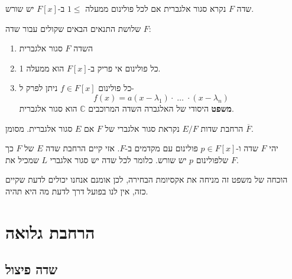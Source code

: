 \documentclass{tstextbook}
\begin{document}
\begin{definition}
שדה \(F\) נקרא סגור אלגברית אם לכל פולינום ממעלה \(1\leq\) ב-\(F[x]\) יש שורש.

\end{definition}
\begin{proposition}
שלושת התנאים הבאים שקולים עבור שדה \(F\):

  \begin{enumerate}
    \item השדה \(F\) סגור אלגברית 


    \item כל פולינום אי פריק ב-\(F[x]\) הוא ממעלה 1. 


    \item כל פולינום \(f \in F[x]\) ניתן לפרק ל- 
$$f(x)=a\left( x-\lambda_{1} \right)\cdot\;\!\dots\;\!\cdot\left( x-\lambda_{n} \right)$$\textbf{משפט} היסודי של האלגברה
השדה המרוכבים \(\mathbb{C}\) הוא סגור אלגברית.


  \end{enumerate}
\end{proposition}
\begin{definition}
הרחבת שדות \(E / F\) נקראת סגור אלגברי של \(F\) אם \(E\) סגור אלגברית. מסומן \(\overline{F}\).

\end{definition}
\begin{theorem}
יהי \(F\) שדה ו-\(p \in F[x]\) פולינום עם מקדמים ב-\(F\). אזי קיים הרחבת שדה \(E\) של \(F\) כך שלפולינום \(p\) יש שורש. כלומר לכל שדה יש סגור אלגברי \(L\) שמכיל את \(F\).

\end{theorem}
\begin{remark}
הוכחה של משפט זה מניחה את אקסיומת הבחירה, לכן אומנם אנחנו יכולים לדעת שקיים כזה, אין לנו בפועל דרך לדעת מה היא תהיה.

\end{remark}
\section{הרחבת גלואה}

\subsection{שדה פיצול}
\end{document}
